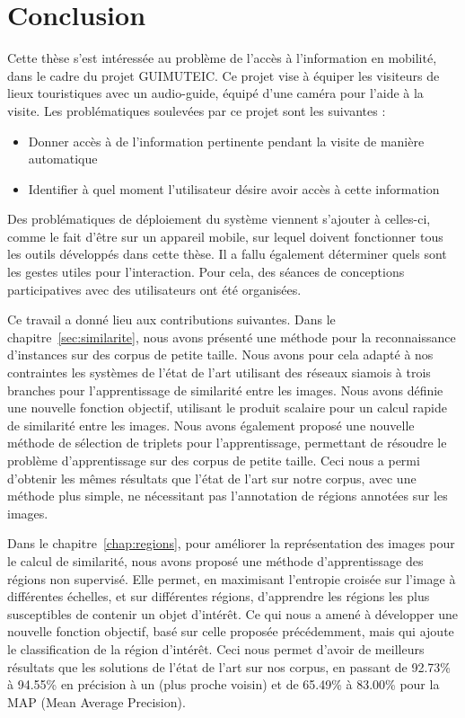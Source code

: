 \chapter{Conclusion}
\label{chap:conclusion}


Cette thèse s'est intéressée au problème de l'accès à l'information en mobilité, dans le cadre du projet GUIMUTEIC.
Ce projet vise à équiper les visiteurs de lieux touristiques avec un audio-guide, équipé d'une caméra pour l'aide à la visite.
Les problématiques soulevées par ce projet sont les suivantes : 

\begin{itemize}
	\item Donner accès à de l'information pertinente pendant la visite de manière automatique
	\item Identifier à quel moment l'utilisateur désire avoir accès à cette information
\end{itemize}

Des problématiques de déploiement du système viennent s'ajouter à celles-ci, comme le fait d'être sur un appareil mobile, sur lequel doivent fonctionner tous les outils développés dans cette thèse.
Il a fallu également déterminer quels sont les gestes utiles pour l'interaction.
Pour cela, des séances de conceptions participatives avec des utilisateurs ont été organisées.

Ce travail a donné lieu aux contributions suivantes.
Dans le chapitre~\ref{sec:similarite}, nous avons présenté une méthode pour la reconnaissance d'instances sur des corpus de petite taille.
Nous avons pour cela adapté à nos contraintes les systèmes de l'état de l'art utilisant des réseaux siamois à trois branches pour l'apprentissage de similarité entre les images.
Nous avons définie une nouvelle fonction objectif, utilisant le produit scalaire pour un calcul rapide de similarité entre les images.
Nous avons également proposé une nouvelle méthode de sélection de triplets pour l'apprentissage, permettant de résoudre le problème d'apprentissage sur des corpus de petite taille.
Ceci nous a permi d'obtenir les mêmes résultats que l'état de l'art sur notre corpus, avec une méthode plus simple, ne nécessitant pas l'annotation de régions annotées sur les images.

Dans le chapitre~\ref{chap:regions}, pour améliorer la représentation des images pour le calcul de similarité, nous avons proposé une méthode d'apprentissage des régions non supervisé.
Elle permet, en maximisant l'entropie croisée sur l'image à différentes échelles, et sur différentes régions, d'apprendre les régions les plus susceptibles de contenir un objet d'intérêt.
Ce qui nous a amené à développer une nouvelle fonction objectif, basé sur celle proposée précédemment, mais qui ajoute le classification de la région d'intérêt.
Ceci nous permet d'avoir de meilleurs résultats que les solutions de l'état de l'art sur nos corpus, en passant de 92.73\% à 94.55\% en précision à un (plus proche voisin) et de 65.49\% à 83.00\% pour la MAP (Mean Average Precision).

